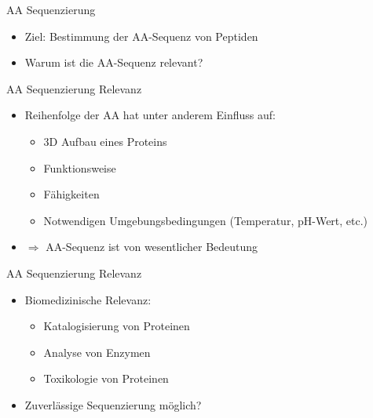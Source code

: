 \documentclass{beamer}
\newcommand{\dashAndSpace}{\textendash \space}
\newcommand{\highlightColor}{nDarkBlue!55!}
\begin{document}
        \begin{frame}{AA Sequenzierung}
        \begin{itemize}
        \item<1-> Ziel: Bestimmung der \textcolor{\highlightColor}{AA-Sequenz} von Peptiden
        \vspace*{0.5cm}
        \item<2-> Warum ist die AA-Sequenz relevant?
        \end{itemize}
        \end{frame}


        \begin{frame}{AA Sequenzierung \dashAndSpace Relevanz}
        \begin{itemize}
        \item<1-> Reihenfolge der AA hat unter anderem Einfluss auf:
        \begin{itemize}
         \item<2-> 3D Aufbau eines Proteins
         \item<2-> Funktionsweise
         \item<2-> Fähigkeiten
         \item<2-> Notwendigen Umgebungsbedingungen (Temperatur, pH-Wert, etc.)
        \end{itemize}
        \item<3-> $\Rightarrow$ AA-Sequenz ist von \textcolor{\highlightColor}{wesentlicher Bedeutung}
        \end{itemize}
        \end{frame}


        \begin{frame}{AA Sequenzierung \dashAndSpace Relevanz}
        \begin{itemize}
        \item<1-> Biomedizinische Relevanz:
        \begin{itemize}
         \item<2-> Katalogisierung von Proteinen
         \item<2-> Analyse von Enzymen
         \item<2-> Toxikologie von Proteinen
        \end{itemize}
        \vspace*{0.5cm}
        \item<3-> Zuverlässige Sequenzierung möglich?
        \end{itemize}
        \end{frame}
\end{document}
